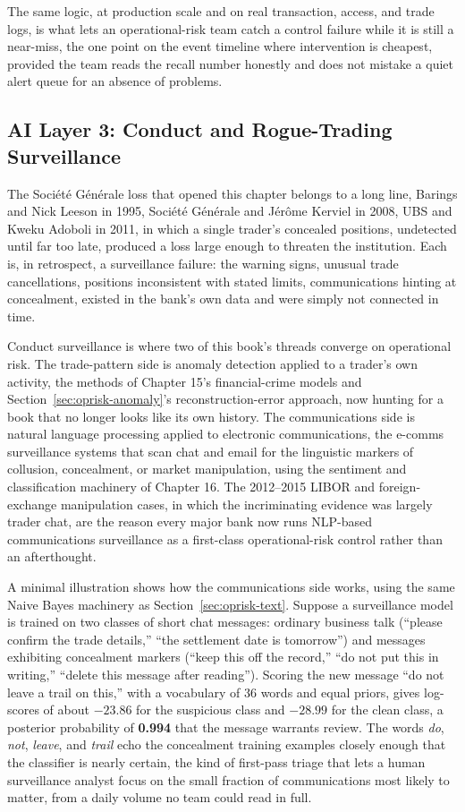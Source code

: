 \documentclass[../ai_in_finance]{subfiles}
\begin{document}
The same logic, at production scale and on real transaction, access, and trade logs, is what lets an operational-risk team catch a control failure while it is still a near-miss, the one point on the event timeline where intervention is cheapest, provided the team reads the recall number honestly and does not mistake a quiet alert queue for an absence of problems.

\subsection{AI Layer 3: Conduct and Rogue-Trading Surveillance}
\label{sec:oprisk-surveillance}

The Société Générale loss that opened this chapter belongs to a long line, Barings and Nick Leeson in 1995, Société Générale and Jérôme Kerviel in 2008, UBS and Kweku Adoboli in 2011, in which a single trader's concealed positions, undetected until far too late, produced a loss large enough to threaten the institution. Each is, in retrospect, a surveillance failure: the warning signs, unusual trade cancellations, positions inconsistent with stated limits, communications hinting at concealment, existed in the bank's own data and were simply not connected in time.

Conduct surveillance is where two of this book's threads converge on operational risk. The trade-pattern side is anomaly detection applied to a trader's own activity, the methods of Chapter 15's financial-crime models and Section~\ref{sec:oprisk-anomaly}'s reconstruction-error approach, now hunting for a book that no longer looks like its own history. The communications side is natural language processing applied to electronic communications, the e-comms surveillance systems that scan chat and email for the linguistic markers of collusion, concealment, or market manipulation, using the sentiment and classification machinery of Chapter 16. The 2012--2015 LIBOR and foreign-exchange manipulation cases, in which the incriminating evidence was largely trader chat, are the reason every major bank now runs NLP-based communications surveillance as a first-class operational-risk control rather than an afterthought.

A minimal illustration shows how the communications side works, using the same Naive Bayes machinery as Section~\ref{sec:oprisk-text}. Suppose a surveillance model is trained on two classes of short chat messages: ordinary business talk (``please confirm the trade details,'' ``the settlement date is tomorrow'') and messages exhibiting concealment markers (``keep this off the record,'' ``do not put this in writing,'' ``delete this message after reading''). Scoring the new message ``do not leave a trail on this,'' with a vocabulary of 36 words and equal priors, gives log-scores of about $-23.86$ for the suspicious class and $-28.99$ for the clean class, a posterior probability of \textbf{0.994} that the message warrants review. The words \emph{do}, \emph{not}, \emph{leave}, and \emph{trail} echo the concealment training examples closely enough that the classifier is nearly certain, the kind of first-pass triage that lets a human surveillance analyst focus on the small fraction of communications most likely to matter, from a daily volume no team could read in full.
\end{document}
